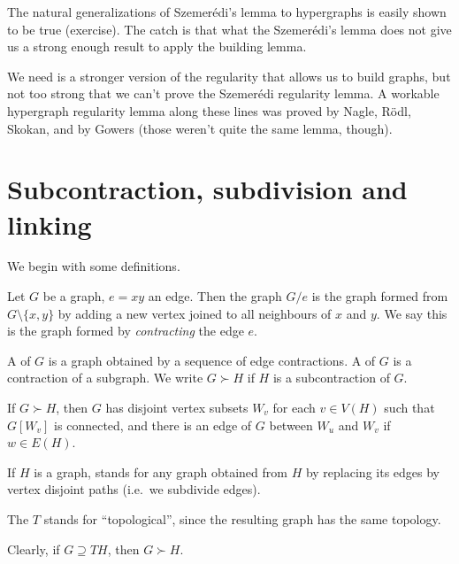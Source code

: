 \documentclass[a4paper]{article}
\begin{document}
The natural generalizations of Szemer\'edi's lemma to hypergraphs is easily shown to be true (exercise). The catch is that what the Szemer\'edi's lemma does not give us a strong enough result to apply the building lemma.

We need is a stronger version of the regularity that allows us to build graphs, but not too strong that we can't prove the Szemer\'edi regularity lemma. A workable hypergraph regularity lemma along these lines was proved by Nagle, R\"odl, Skokan, and by Gowers (those weren't quite the same lemma, though).

\section{Subcontraction, subdivision and linking}
We begin with some definitions.
\begin{defi}
  Let $G$ be a graph, $e = xy$ an edge. Then the graph $G/e$ is the graph formed from $G \setminus \{x, y\}$ by adding a new vertex joined to all neighbours of $x$ and $y$. We say this is the graph formed by \emph{contracting} the edge $e$.
\end{defi}


\begin{defi}
  A  of $G$ is a graph obtained by a sequence of edge contractions. A  of $G$ is a contraction of a subgraph. We write $G \succ H$ if $H$ is a subcontraction of $G$.
\end{defi}
If $G \succ H$, then $G$ has disjoint vertex subsets $W_v$ for each $v \in V(H)$ such that $G[W_v]$ is connected, and there is an edge of $G$ between $W_u$ and $W_v$ if $w \in E(H)$.

\begin{defi}[Subdivision]
  If $H$ is a graph,  stands for any graph obtained from $H$ by replacing its edges by vertex disjoint paths (i.e.\ we subdivide edges).
\end{defi}
The $T$ stands for ``topological'', since the resulting graph has the same topology.

Clearly, if $G \supseteq TH$, then $G \succ H$.

\begin{center}
\end{center}
\end{document}
